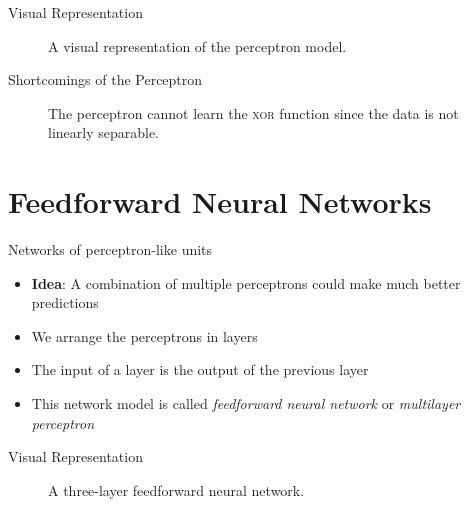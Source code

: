 \documentclass{beamer}
\begin{document}
	\begin{frame}{Visual Representation}
		\begin{figure}
			
			\caption{A visual representation of the perceptron model.}
		\end{figure}
	\end{frame}
	\begin{frame}{Shortcomings of the Perceptron}
		\begin{figure}
						
			\caption{The perceptron cannot learn the \textsc{xor} function since the data is not linearly separable.}
		\end{figure}
	\end{frame}
	
	\section{Feedforward Neural Networks}
	
	\begin{frame}{Networks of perceptron-like units}
		\begin{itemize}
			\item <1-> \textbf{Idea}: A combination of multiple perceptrons could make much better predictions
			\item <2-> We arrange the perceptrons in layers
			\item <3-> The input of a layer is the output of the previous layer
			\item <4-> This network model is called \emph{feedforward neural network} or \emph{multilayer perceptron}
		\end{itemize}
	\end{frame}
	
	\begin{frame}{Visual Representation}
		\begin{figure}
			
			\caption{A three-layer feedforward neural network.}
		\end{figure}
	\end{frame}
	
\end{document}
